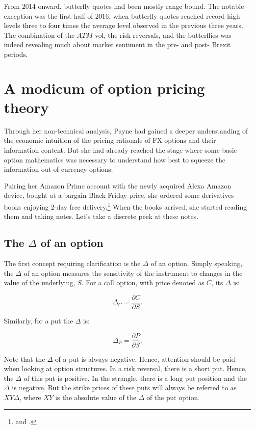 \documentclass[]{book}
\let\rmarkdownfootnote\footnote%
\def\footnote{\protect\rmarkdownfootnote}
\theoremstyle{definition}
\theoremstyle{definition}
\theoremstyle{definition}
\theoremstyle{remark}
\begin{document}
From 2014 onward, butterfly quotes had been mostly range bound. The
notable exception was the first half of 2016, when butterfly quotes
reached record high levels three to four times the average level
observed in the previous three years. The combination of the \(ATM\)
vol, the risk reversals, and the butterflies was indeed revealing much
about market sentiment in the pre- and post- Brexit periods.

\chapter{A modicum of option pricing
theory}\label{a-modicum-of-option-pricing-theory}

Through her non-technical analysis, Payne had gained a deeper
understanding of the economic intuition of the pricing rationale of FX
options and their information content. But she had already reached the
stage where some basic option mathematics was necessary to understand
how best to squeeze the information out of currency options.

Pairing her Amazon Prime account with the newly acquired Alexa Amazon
device, bought at a bargain Black Friday price, she ordered some
derivatives books enjoying 2-day free delivery.\footnote{\citet{Wilmott2006}
  and \citet{Hull2017}.} When the books arrived, she started reading
them and taking notes. Let's take a discrete peek at these notes.

\section{\texorpdfstring{The \(\Delta\) of an
option}{The \textbackslash{}Delta of an option}}\label{the-delta-of-an-option}

The first concept requiring clarification is the \(\Delta\) of an
option. Simply speaking, the \(\Delta\) of an option measures the
sensitivity of the instrument to changes in the value of the underlying,
\(S\). For a call option, with price denoted as \(C\), its \(\Delta\)
is:

\[ \Delta_C = \frac{\partial C}{\partial S}.\]

Similarly, for a put the \(\Delta\) is:

\[ \Delta_P = \frac{\partial P}{\partial S}.\]

Note that the \(\Delta\) of a put is always negative. Hence, attention
should be paid when looking at option structures. In a risk reversal,
there is a short put. Hence, the \(\Delta\) of this put is positive. In
the strangle, there is a long put position and the \(\Delta\) is
negative. But the strike prices of these puts will always be referred to
as \(XY\Delta\), where \(XY\) is the absolute value of the \(\Delta\) of
the put option.
\end{document}
